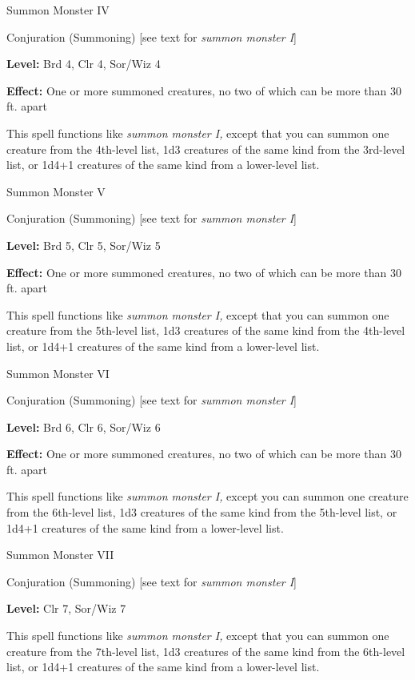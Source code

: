 \documentclass{article}
\begin{document}
\vspace{12pt}
Summon Monster IV

Conjuration (Summoning) [see text for \textit{summon monster I}]

\textbf{Level:} Brd 4, Clr 4, Sor/Wiz 4

\textbf{Effect:} One or more summoned creatures, no two of which can be more than 
30 ft. apart

This spell functions like \textit{summon monster I, }except that you can summon 
one creature from the 4th-level list, 1d3 creatures of the same kind from the 3rd-level 
list, or 1d4+1 creatures of the same kind from a lower-level list.

\vspace{12pt}
Summon Monster V

Conjuration (Summoning) [see text for \textit{summon monster I}]

\textbf{Level:} Brd 5, Clr 5, Sor/Wiz 5

\textbf{Effect:} One or more summoned creatures, no two of which can be more than 
30 ft. apart

This spell functions like \textit{summon monster I, }except that you can summon 
one creature from the 5th-level list, 1d3 creatures of the same kind from the 4th-level 
list, or 1d4+1 creatures of the same kind from a lower-level list.

\vspace{12pt}
Summon Monster VI

Conjuration (Summoning) [see text for \textit{summon monster I}]

\textbf{Level:} Brd 6, Clr 6, Sor/Wiz 6

\textbf{Effect:} One or more summoned creatures, no two of which can be more than 
30 ft. apart

This spell functions like \textit{summon monster I, }except you can summon one 
creature from the 6th-level list, 1d3 creatures of the same kind from the 5th-level 
list, or 1d4+1 creatures of the same kind from a lower-level list.

\vspace{12pt}
Summon Monster VII

Conjuration (Summoning) [see text for \textit{summon monster I}]

\textbf{Level:} Clr 7, Sor/Wiz 7

This spell functions like \textit{summon monster I, }except that you can summon 
one creature from the 7th-level list, 1d3 creatures of the same kind from the 6th-level 
list, or 1d4+1 creatures of the same kind from a lower-level list.
\end{document}
